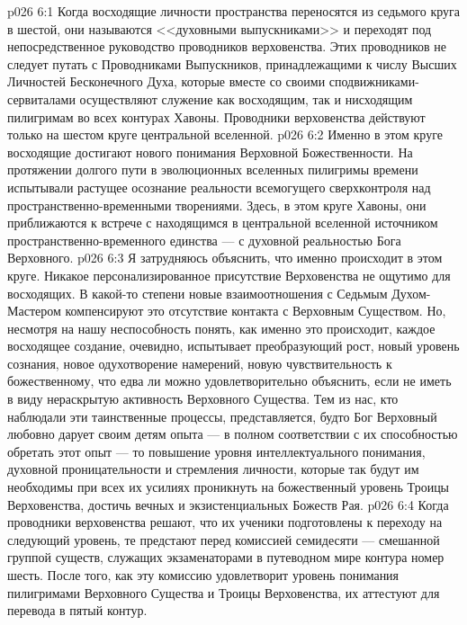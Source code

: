 \vs p026 6:1 Когда восходящие личности пространства переносятся из седьмого круга в шестой, они называются <<духовными выпускниками>> и переходят под непосредственное руководство проводников верховенства. Этих проводников не следует путать с Проводниками Выпускников, принадлежащими к числу Высших Личностей Бесконечного Духа, которые вместе со своими сподвижниками\hyp{}сервиталами осуществляют служение как восходящим, так и нисходящим пилигримам во всех контурах Хавоны. Проводники верховенства действуют только на шестом круге центральной вселенной.
\vs p026 6:2 Именно в этом круге восходящие достигают нового понимания Верховной Божественности. На протяжении долгого пути в эволюционных вселенных пилигримы времени испытывали растущее осознание реальности всемогущего сверхконтроля над пространственно\hyp{}временными творениями. Здесь, в этом круге Хавоны, они приближаются к встрече с находящимся в центральной вселенной источником пространственно\hyp{}временного единства --- с духовной реальностью Бога Верховного.
\vs p026 6:3 Я затрудняюсь объяснить, что именно происходит в этом круге. Никакое персонализированное присутствие Верховенства не ощутимо для восходящих. В какой\hyp{}то степени новые взаимоотношения с Седьмым Духом\hyp{}Мастером компенсируют это отсутствие контакта с Верховным Существом. Но, несмотря на нашу неспособность понять, как именно это происходит, каждое восходящее создание, очевидно, испытывает преобразующий рост, новый уровень сознания, новое одухотворение намерений, новую чувствительность к божественному, что едва ли можно удовлетворительно объяснить, если не иметь в виду нераскрытую активность Верховного Существа. Тем из нас, кто наблюдали эти таинственные процессы, представляется, будто Бог Верховный любовно дарует своим детям опыта --- в полном соответствии с их способностью обретать этот опыт --- то повышение уровня интеллектуального понимания, духовной проницательности и стремления личности, которые так будут им необходимы при всех их усилиях проникнуть на божественный уровень Троицы Верховенства, достичь вечных и экзистенциальных Божеств Рая.
\vs p026 6:4 Когда проводники верховенства решают, что их ученики подготовлены к переходу на следующий уровень, те предстают перед комиссией семидесяти --- смешанной группой существ, служащих экзаменаторами в путеводном мире контура номер шесть. После того, как эту комиссию удовлетворит уровень понимания пилигримами Верховного Существа и Троицы Верховенства, их аттестуют для перевода в пятый контур.
